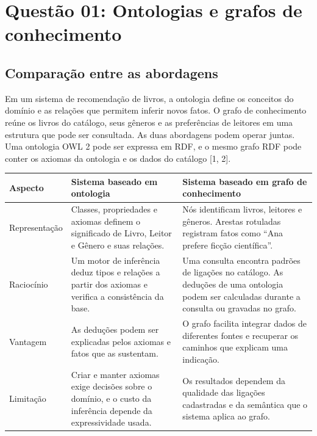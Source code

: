 \documentclass[12pt,a4paper]{article}
\begin{document}
\section{Questão 01: Ontologias e grafos de conhecimento}

\subsection{Comparação entre as abordagens}

Em um sistema de recomendação de livros, a ontologia define os conceitos do domínio e as relações que permitem inferir novos fatos. O grafo de conhecimento reúne os livros do catálogo, seus gêneros e as preferências de leitores em uma estrutura que pode ser consultada. As duas abordagens podem operar juntas. Uma ontologia OWL 2 pode ser expressa em RDF, e o mesmo grafo RDF pode conter os axiomas da ontologia e os dados do catálogo [1, 2].

\begin{table}[htbp]
    \centering
    \begin{tabular}{>{\raggedright\arraybackslash}p{2.7cm} >{\raggedright\arraybackslash}p{5.8cm} >{\raggedright\arraybackslash}p{6.0cm}}
        \toprule
        \textbf{Aspecto} & \textbf{Sistema baseado em ontologia} & \textbf{Sistema baseado em grafo de conhecimento} \\
        \midrule
        Representação & Classes, propriedades e axiomas definem o significado de Livro, Leitor e Gênero e suas relações. & Nós identificam livros, leitores e gêneros. Arestas rotuladas registram fatos como ``Ana prefere ficção científica''. \\
        \addlinespace
        Raciocínio & Um motor de inferência deduz tipos e relações a partir dos axiomas e verifica a consistência da base. & Uma consulta encontra padrões de ligações no catálogo. As deduções de uma ontologia podem ser calculadas durante a consulta ou gravadas no grafo. \\
        \addlinespace
        Vantagem & As deduções podem ser explicadas pelos axiomas e fatos que as sustentam. & O grafo facilita integrar dados de diferentes fontes e recuperar os caminhos que explicam uma indicação. \\
        \addlinespace
        Limitação & Criar e manter axiomas exige decisões sobre o domínio, e o custo da inferência depende da expressividade usada. & Os resultados dependem da qualidade das ligações cadastradas e da semântica que o sistema aplica ao grafo. \\
        \bottomrule
    \end{tabular}
\end{table}
\end{document}

